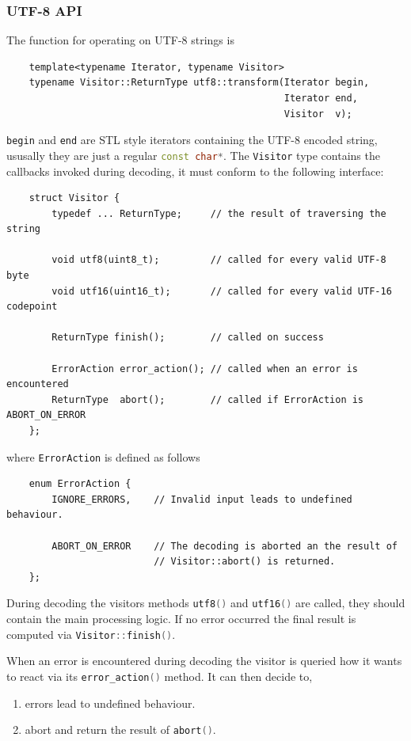 \documentclass[12pt,a4paper,oneside]{article}
\newcommand{\cpp}[1]{\lstinline[language=C++]{#1}}
\begin{document}
\clearpage
\subsubsection{UTF-8 API}
	The function for operating on UTF-8 strings is
		\begin{lstlisting}
	template<typename Iterator, typename Visitor>
	typename Visitor::ReturnType utf8::transform(Iterator begin,
	                                             Iterator end, 
	                                             Visitor  v);
		\end{lstlisting}

	\cpp{begin} and \cpp{end} are STL style iterators containing the UTF-8 encoded string,
	ususally they are just a regular \cpp{const char*}.
	The \cpp{Visitor} type contains the callbacks invoked during decoding, it must conform to the following interface:
		\begin{lstlisting}
	struct Visitor {
		typedef ... ReturnType;     // the result of traversing the string

		void utf8(uint8_t);         // called for every valid UTF-8 byte
		void utf16(uint16_t);       // called for every valid UTF-16 codepoint

		ReturnType finish();        // called on success

		ErrorAction error_action(); // called when an error is encountered
		ReturnType  abort();        // called if ErrorAction is ABORT_ON_ERROR
	};
		\end{lstlisting}
	\vspace*{5pt}
	where \cpp{ErrorAction} is defined as follows
		\begin{lstlisting}
	enum ErrorAction {
		IGNORE_ERRORS,    // Invalid input leads to undefined behaviour.

		ABORT_ON_ERROR    // The decoding is aborted an the result of
		                  // Visitor::abort() is returned.
	};
		\end{lstlisting}

	During decoding the visitors methods \cpp{utf8()} and \cpp{utf16()} are called,
	they should contain the main processing logic.
	If no error occurred the final result is computed via \cpp{Visitor::finish()}.

	When an error is encountered during decoding the visitor is queried how it wants to react 
	via its \cpp{error_action()} method.
	It can then decide to,
	\begin{enumerate}[label=\alph*)]
		\item errors lead to undefined behaviour.
		\item abort and return the result of \cpp{abort()}.
	\end{enumerate}
\end{document}
